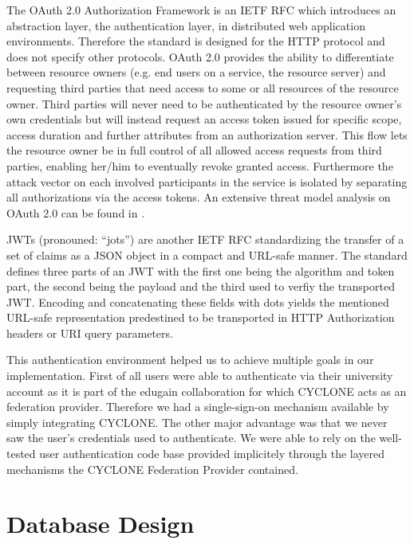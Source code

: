 The OAuth 2.0 Authorization Framework is an IETF RFC \cite{hardt2012oauth} which introduces an abstraction layer, the authentication layer, in distributed web application environments. Therefore the standard is designed for the HTTP protocol and does not specify other protocols. OAuth 2.0 provides the ability to differentiate between resource owners (e.g. end users on a service, the resource server) and requesting third parties that need access to some or all resources of the resource owner. Third parties will never need to be authenticated by the resource owner's own credentials but will instead request an access token issued for specific scope, access duration and further attributes from an authorization server. This flow lets the resource owner be in full control of all allowed access requests from third parties, enabling her/him to eventually revoke granted access. Furthermore the attack vector on each involved participants in the service is isolated by separating all authorizations via the access tokens. An extensive threat model analysis on OAuth 2.0 can be found in \cite{lodderstedt2013oauth}.

JWTs (pronouned: \enquote{jots}) are another IETF RFC \cite{bradley2015json} standardizing the transfer of a set of claims as a JSON object in a compact and URL-safe manner. The standard defines three parts of an JWT with the first one being the algorithm and token part, the second being the payload and the third used to verfiy the transported JWT. Encoding and concatenating these fields with dots yields the mentioned URL-safe representation predestined to be transported in HTTP Authorization headers or URI query parameters.

This authentication environment helped us to achieve multiple goals in our implementation. First of all users were able to authenticate via their university account as it is part of the edugain collaboration for which CYCLONE acts as an federation provider. Therefore we had a single-sign-on mechanism available by simply integrating CYCLONE. The other major advantage was that we never saw the user's credentials used to authenticate. We were able to rely on the well-tested user authentication code base provided implicitely through the layered mechanisms the CYCLONE Federation Provider contained.


\vspace{0.5cm}

\section{Database Design}